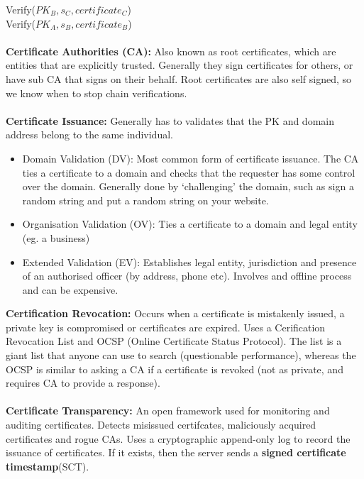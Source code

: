 \documentclass[a4paper,10pt]{article}
\begin{document}
\indent Verify($PK_{B}, s_{C}, certificate_{C}$)\\
\indent Verify($PK_{A}, s_{B}, certificate_{B}$)\\\\
\textcolor{RoyalPurple}{\textbf{Certificate Authorities (CA):}} Also known as root certificates, which are entities that are explicitly trusted. Generally they sign certificates for others, or have sub CA that signs on their behalf. Root certificates are also self signed, so we know when to stop chain verifications. \\\\ 
\textcolor{RoyalPurple}{\textbf{Certificate Issuance:}} Generally has to validates that the PK and domain address belong to the same individual.
\begin{itemize}
\item \textcolor{RoyalPurple}{Domain Validation (DV):} Most common form of certificate issuance. The CA ties a certificate to a domain and checks that the requester has some control over the domain. Generally done by `challenging' the domain, such as sign a random string and put a random string on your website. 
\item \textcolor{RoyalPurple}{Organisation Validation (OV):} Ties a certificate to a domain and legal entity (eg. a business)
\item \textcolor{RoyalPurple}{Extended Validation (EV):} Establishes legal entity, jurisdiction and presence of an authorised officer (by address, phone etc). Involves and offline process and can be expensive. 	
\end{itemize}
\textcolor{RoyalPurple}{\textbf{Certification Revocation:}} Occurs when a certificate is mistakenly issued, a private key is compromised or certificates are expired. Uses a Cerification Revocation List and OCSP (Online Certificate Status Protocol). The list is a giant list that anyone can use to search (questionable performance), whereas the OCSP is similar to asking a CA if a certificate is revoked (not as private, and requires CA to provide a response).\\\\ 
\textcolor{RoyalPurple}{\textbf{Certificate Transparency:}} An open framework used for monitoring and auditing certificates. Detects misissued certifcates, maliciously acquired certificates and rogue CAs. Uses a cryptographic append-only log to record the issuance of certificates. If it exists, then the server sends a \textbf{signed certificate timestamp}(SCT). 
\newpage
\end{document}
